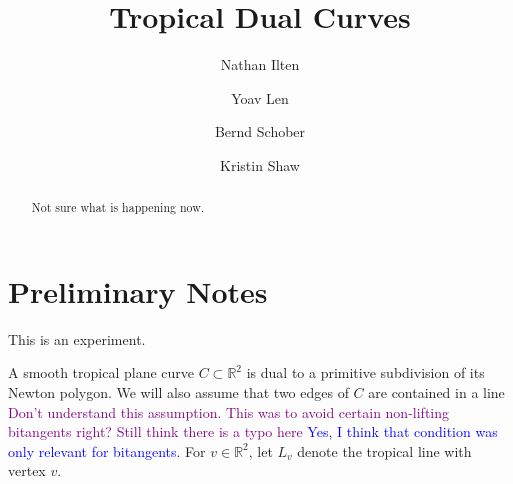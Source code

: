\documentclass[oneside]{amsart}
\title{Tropical Dual Curves}
\author{Nathan Ilten}
\author{Yoav Len}
\author{Bernd Schober}
\author{Kristin Shaw}
\newcommand{\RR}{\mathbb{R}}
\theoremstyle{definition}
\newcommand{\yoav}[1]{\textcolor{blue}{#1}}
\newcommand{\kristin}[1]{\textcolor{purple}{#1}}
\begin{document}
\begin{abstract}
Not sure what is happening now. 
\end{abstract}
\maketitle
\section{Preliminary Notes}
This is an experiment. 

A smooth tropical plane curve $C\subset \mathbb{R}^2$ is dual to a primitive
subdivision of its Newton polygon. We will also assume that  two edges  of $C$
are contained in a line  \kristin{Don't understand this assumption. This was to
avoid certain non-lifting bitangents right?
Still think there is a typo here} \yoav{Yes, I think that condition was only relevant for bitangents.} For $v\in\RR^2$, let
$L_v$ denote the tropical line with vertex $v$.
\end{document}
